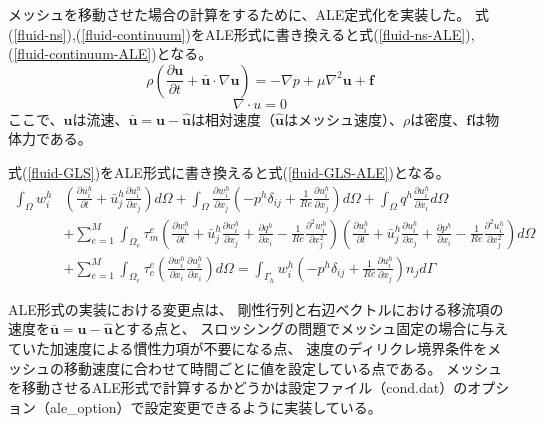 メッシュを移動させた場合の計算をするために、ALE定式化を実装した。
式(\ref{fluid-ns}),(\ref{fluid-continuum})をALE形式に書き換えると式(\ref{fluid-ns-ALE}),(\ref{fluid-continuum-ALE})となる。
\begin{equation}
\label{fluid-ns-ALE}
	\rho \left(
	\frac{\partial \bm{u}}{\partial t} + \bm{\bar{u}} \cdot \nabla \bm{u}
	\right) 
	= - \nabla p + \mu \nabla^{2} \bm{u} + \bm{f}
\end{equation}
\begin{equation}
\label{fluid-continuum-ALE}
	\nabla \cdot u = 0
\end{equation}
ここで、$\bm{u}$は流速、$\bm{\bar{u}}=\bm{u}-\bm{\hat{u}}$は相対速度（$\bm{\hat{u}}$はメッシュ速度）、$\rho$は密度、$\bm{f}$は物体力である。


式(\ref{fluid-GLS})をALE形式に書き換えると式(\ref{fluid-GLS-ALE})となる。
\begin{equation}
\label{fluid-GLS-ALE}
	\begin{aligned} 
		\int_{\Omega} w_i^h & \left(\frac{\partial u_i^h}{\partial t}+\bar{u}_j^h \frac{\partial u_i^h}{\partial x_j}\right) d \Omega
		+ \int_{\Omega} \frac{\partial w_i^h}{\partial x_j}\left(-p^h \delta_{i j}+\frac{1}{R e} \frac{\partial u_i^h}{\partial x_j}\right) d \Omega
		+ \int_{\Omega} q^h \frac{\partial u_i^h}{\partial x_i} d \Omega \\ & 
		+ \sum_{e=1}^M \int_{\Omega_e} \tau_m^e\left(\frac{\partial w_i^h}{\partial t}+\bar{u}_j^h \frac{\partial w_i^h}{\partial x_j}+\frac{\partial q^h}{\partial x_i}-\frac{1}{R e} \frac{\partial^2 w_i^h}{\partial x_j^2}\right)\left(\frac{\partial u_i^h}{\partial t}+\bar{u}_j^h \frac{\partial u_i^h}{\partial x_j}+\frac{\partial p^h}{\partial x_i}-\frac{1}{R e} \frac{\partial^2 u_i^h}{\partial x_j^2}\right) d \Omega \\ & 
		+ \sum_{e=1}^M \int_{\Omega_e} \tau_c^e\left(\frac{\partial w_i^h}{\partial x_i} \frac{\partial u_i^h}{\partial x_i}\right) d \Omega
		= \int_{\Gamma_h} w_i^h\left(-p^h \delta_{i j}+\frac{1}{R e} \frac{\partial u_i^h}{\partial x_j}\right) n_j d \Gamma
	\end{aligned}
\end{equation}

ALE形式の実装における変更点は、
剛性行列と右辺ベクトルにおける移流項の速度を$\bm{\bar{u}}=\bm{u}-\bm{\hat{u}}$とする点と、
スロッシングの問題でメッシュ固定の場合に与えていた加速度による慣性力項が不要になる点、
速度のディリクレ境界条件をメッシュの移動速度に合わせて時間ごとに値を設定している点である。
メッシュを移動させるALE形式で計算するかどうかは設定ファイル（cond.dat）のオプション（ale\_option）で設定変更できるように実装している。